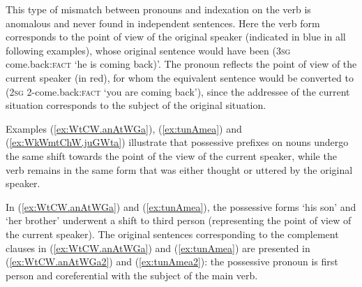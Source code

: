 This type of mismatch between pronouns and indexation on the verb is anomalous and never found in independent sentences. Here the verb form corresponds to the point of view of the original speaker (indicated in blue in all following examples), whose original sentence would have been  (\textsc{3sg} {come.back:\textsc{fact}} `he is coming back)'. The pronoun reflects the point of view of the current speaker (in red), for whom the equivalent sentence would be converted to  (\textsc{2sg} {2-come.back:\textsc{fact}} `you are coming back'), since the addressee of the current situation corresponds to the subject of the original situation.

Examples (\ref{ex:WtCW.anAtWGa}), (\ref{ex:tunAmea}) and (\ref{ex:WkWmtChW.juGWta}) illustrate that possessive prefixes on nouns undergo the same shift towards the point of the view of the current speaker, while the verb remains in the same form that was either thought or uttered by the original speaker.

In (\ref{ex:WtCW.anAtWGa}) and (\ref{ex:tunAmea}), the possessive forms  `his son' and `her brother'  underwent a shift to third person (representing the point of view of the current speaker). The original sentences corresponding to the complement clauses in (\ref{ex:WtCW.anAtWGa}) and (\ref{ex:tunAmea}) are presented in (\ref{ex:WtCW.anAtWGa2}) and (\ref{ex:tunAmea2}): the possessive pronoun is first person and coreferential with the subject of the main verb.
 
